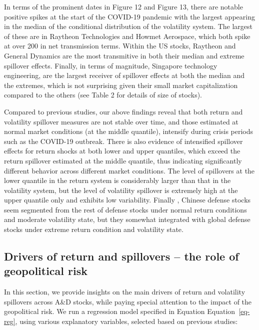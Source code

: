 \documentclass[
  number]{elsarticle}
\begin{document}
In terms of the prominent dates in Figure 12 and Figure 13, there are
notable positive spikes at the start of the COVID-19 pandemic with the
largest appearing in the median of the conditional distribution of the
volatility system. The largest of these are in Raytheon Technologies and
Howmet Aerospace, which both spike at over 200 in net transmission
terms. Within the US stocks, Raytheon and General Dynamics are the most
transmitive in both their median and extreme spillover effects. Finally,
in terms of magnitude, Singapore technology engineering, are the largest
receiver of spillover effects at both the median and the extremes, which
is not surprising given their small market capitalization compared to
the others (see Table 2 for details of size of stocks).

Compared to previous studies, our above findings reveal that both return
and volatility spillover measures are not stable over time, and those
estimated at normal market conditions (at the middle quantile),
intensify during crisis periods such as the COVID-19 outbreak. There is
also evidence of intensified spillover effects for return shocks at both
lower and upper quantiles, which exceed the return spillover estimated
at the middle quantile, thus indicating significantly different behavior
across different market conditions. The level of spillovers at the lower
quantile in the return system is considerably larger than that in the
volatility system, but the level of volatility spillover is extremely
high at the upper quantile only and exhibits low variability. Finally ,
Chinese defense stocks seem segmented from the rest of defense stocks
under normal return conditions and moderate volatility state, but they
somewhat integrated with global defense stocks under extreme return
condition and volatility state.

\hypertarget{drivers-of-return-and-spillovers-the-role-of-geopolitical-risk}{%
\subsection{Drivers of return and spillovers -- the role of geopolitical
risk}\label{drivers-of-return-and-spillovers-the-role-of-geopolitical-risk}}

In this section, we provide insights on the main drivers of return and
volatility spillovers across A\&D stocks, while paying special attention
to the impact of the geopolitical risk. We run a regression model
specified in Equation Equation~\ref{eq-reg}, using various explanatory
variables, selected based on previous studies:
\end{document}
